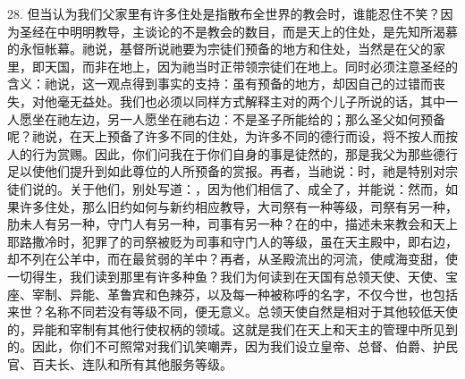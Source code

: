 28. 但当认为我们父家里有许多住处是指散布全世界的教会时，谁能忍住不笑？因为圣经在中明明教导，主谈论的不是教会的数目，而是天上的住处，是先知所渴慕的永恒帐幕。祂说，基督所说祂要为宗徒们预备的地方和住处，当然是在父的家里，即天国，而非在地上，因为祂当时正带领宗徒们在地上。同时必须注意圣经的含义：祂说，这一观点得到事实的支持：虽有预备的地方，却因自己的过错而丧失，对他毫无益处。我们也必须以同样方式解释主对的两个儿子所说的话，其中一人愿坐在祂左边，另一人愿坐在祂右边：不是圣子所能给的；那么圣父如何预备呢？祂说，在天上预备了许多不同的住处，为许多不同的德行而设，将不按人而按人的行为赏赐。因此，你们问我在于你们自身的事是徒然的，那是我父为那些德行足以使他们提升到如此尊位的人所预备的赏报。再者，当祂说：时，祂是特别对宗徒们说的。关于他们，别处写道：，因为他们相信了、成全了，并能说：然而，如果许多住处，那么旧约如何与新约相应教导，大司祭有一种等级，司祭有另一种，肋未人有另一种，守门人有另一种，司事有另一种？在的中，描述未来教会和天上耶路撒冷时，犯罪了的司祭被贬为司事和守门人的等级，虽在天主殿中，即右边，却不列在公羊中，而在最贫弱的羊中？再者，从圣殿流出的河流，使咸海变甜，使一切得生，我们读到那里有许多种鱼？我们为何读到在天国有总领天使、天使、宝座、宰制、异能、革鲁宾和色辣芬，以及每一种被称呼的名字，不仅今世，也包括来世？名称不同若没有等级不同，便无意义。总领天使自然是相对于其他较低天使的，异能和宰制有其他行使权柄的领域。这就是我们在天上和天主的管理中所见到的。因此，你们不可照常对我们讥笑嘲弄，因为我们设立皇帝、总督、伯爵、护民官、百夫长、连队和所有其他服务等级。\par

